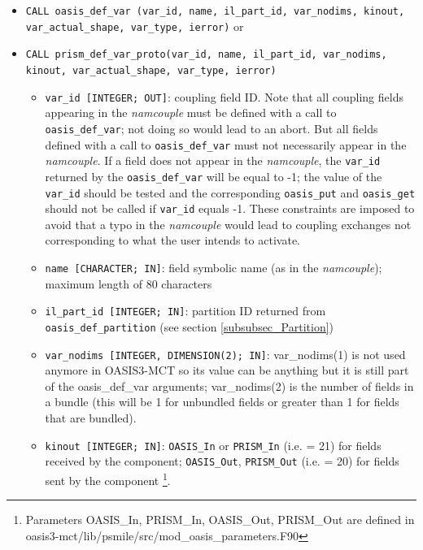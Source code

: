 \begin{itemize}

\item {\tt CALL oasis\_def\_var (var\_id, name, il\_part\_id,
    var\_nodims, kinout, \newline var\_actual\_shape, var\_type,
    ierror)} or

\item {\tt CALL prism\_def\_var\_proto(var\_id, name, il\_part\_id,
    var\_nodims, kinout, var\_actual\_shape, var\_type, ierror)}

  \begin{itemize}
  \item {\tt var\_id [INTEGER; OUT]}: coupling field ID.  Note that all 
      coupling fields appearing in the {\it namcouple} must be defined with 
      a call to {\tt oasis\_def\_var}; not doing so would lead to an abort.  
      But all fields defined with a call to {\tt oasis\_def\_var} must not necessarily 
      appear in the {\it namcouple}. If a field does not appear in the {\it namcouple}, 
      the {\tt var\_id} returned by the {\tt oasis\_def\_var} will be equal to -1; 
      the value of the {\tt var\_id} should be tested and the corresponding 
      {\tt oasis\_put} and {\tt oasis\_get} should not be called if {\tt var\_id} 
      equals -1. These constraints are imposed to avoid that a typo in the {\it namcouple}
       would lead to coupling exchanges not corresponding to what the user intends to activate. 
  \item {\tt name [CHARACTER; IN]}: field symbolic name (as in the
    {\it namcouple}); maximum length of 80 characters
  \item {\tt il\_part\_id [INTEGER; IN]}: partition ID returned from {\tt oasis\_def\_partition} (see section
    \ref{subsubsec_Partition})
  \item {\tt var\_nodims [INTEGER, DIMENSION(2); IN]}: var\_nodims(1)
    is not used anymore in OASIS3-MCT so its value can be anything but
    it is still part of the oasis\_def\_var arguments; var\_nodims(2) is the number
    of fields in a bundle (this will be 1 for unbundled fields or greater
    than 1 for fields that are bundled).  
  \item {\tt kinout [INTEGER; IN]}: {\tt OASIS\_In} or {\tt PRISM\_In}
    (i.e. = 21) for fields received by the component; {\tt OASIS\_Out},
    {\tt PRISM\_Out} (i.e. = 20) for fields sent by the component
    \footnote{Parameters OASIS\_In, PRISM\_In, OASIS\_Out, PRISM\_Out
      are defined in
      oasis3-mct/lib/psmile/src/mod\_oasis\_parameters.F90}.

\end{itemize}
\end{itemize}
